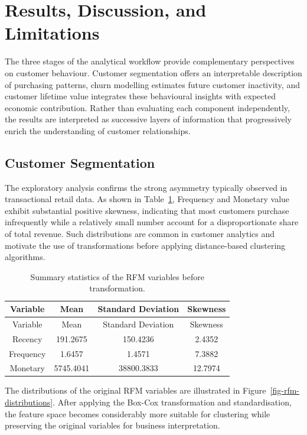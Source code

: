 \documentclass[
  12pt,
  letterpaper,
]{book}
\begin{document}
\section{Results, Discussion, and
Limitations}\label{results-discussion-and-limitations-4}

The three stages of the analytical workflow provide complementary
perspectives on customer behaviour. Customer segmentation offers an
interpretable description of purchasing patterns, churn modelling
estimates future customer inactivity, and customer lifetime value
integrates these behavioural insights with expected economic
contribution. Rather than evaluating each component independently, the
results are interpreted as successive layers of information that
progressively enrich the understanding of customer relationships.

\subsection{Customer Segmentation}\label{customer-segmentation}

The exploratory analysis confirms the strong asymmetry typically
observed in transactional retail data. As shown in
Table~\ref{tbl-rfm-summary}, Frequency and Monetary value exhibit
substantial positive skewness, indicating that most customers purchase
infrequently while a relatively small number account for a
disproportionate share of total revenue. Such distributions are common
in customer analytics and motivate the use of transformations before
applying distance-based clustering algorithms.

\begin{longtable}[]{@{}cccc@{}}
\caption{Summary statistics of the RFM variables before
transformation.}\label{tbl-rfm-summary}\tabularnewline
\toprule\noalign{}
Variable & Mean & Standard Deviation & Skewness \\
\midrule\noalign{}
\endfirsthead
\toprule\noalign{}
Variable & Mean & Standard Deviation & Skewness \\
\midrule\noalign{}
\endhead
\bottomrule\noalign{}
\endlastfoot
Recency & 191.2675 & 150.4236 & 2.4352 \\
Frequency & 1.6457 & 1.4571 & 7.3882 \\
Monetary & 5745.4041 & 38800.3833 & 12.7974 \\
\end{longtable}

The distributions of the original RFM variables are illustrated in
Figure~\ref{fig-rfm-distributions}. After applying the Box-Cox
transformation and standardisation, the feature space becomes
considerably more suitable for clustering while preserving the original
variables for business interpretation.
\end{document}
